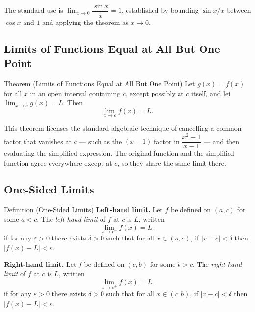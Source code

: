 \begin{remark*}
The standard use is $\lim_{x \to 0} \dfrac{\sin x}{x} = 1$,
established by bounding $\sin x / x$ between $\cos x$ and $1$
and applying the theorem as $x \to 0$.
\end{remark*}

\subsection*{Limits of Functions Equal at All But One Point}

\begin{theorembox}{Theorem (Limits of Functions Equal at All But One Point)}
Let $g(x) = f(x)$ for all $x$ in an open interval containing $c$,
except possibly at $c$ itself, and let $\lim_{x \to c} g(x) = L$.
Then
\[
  \lim_{x \to c} f(x) = L.
\]
\end{theorembox}

\begin{remark*}
This theorem licenses the standard algebraic technique of
cancelling a common factor that vanishes at $c$ --- such as
the $(x-1)$ factor in $\dfrac{x^2-1}{x-1}$ --- and then
evaluating the simplified expression.
The original function and the simplified function agree
everywhere except at $c$, so they share the same limit there.
\end{remark*}

\subsection*{One-Sided Limits}

\begin{propositionbox}{Definition (One-Sided Limits)}
\textbf{Left-hand limit.}
Let $f$ be defined on $(a, c)$ for some $a < c$.
The \emph{left-hand limit} of $f$ at $c$ is $L$, written
\[
  \lim_{x \to c^-} f(x) = L,
\]
if for any $\varepsilon > 0$ there exists $\delta > 0$ such that
for all $x \in (a, c)$, if $|x - c| < \delta$ then $|f(x) - L| < \varepsilon$.

\medskip
\textbf{Right-hand limit.}
Let $f$ be defined on $(c, b)$ for some $b > c$.
The \emph{right-hand limit} of $f$ at $c$ is $L$, written
\[
  \lim_{x \to c^+} f(x) = L,
\]
if for any $\varepsilon > 0$ there exists $\delta > 0$ such that
for all $x \in (c, b)$, if $|x - c| < \delta$ then $|f(x) - L| < \varepsilon$.
\end{propositionbox}

